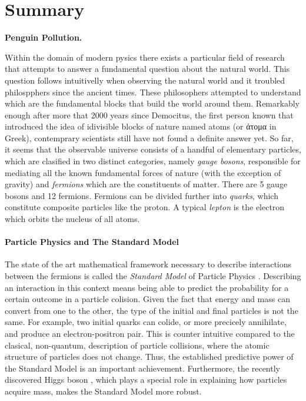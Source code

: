 \chapter*{Summary}
\chaptermark{}

{\Large\bf
  Penguin Pollution.
}
\vspace*{0.05\textwidth}

Within the domain of modern pysics there exists a particular field of research
that attempts to answer a fundamental question about the natural world. This
question follows intuitivelly when observing the natural world and it troubled
philospphers since the ancient times. These philosophers attempted to understand
which are the fundamental blocks that build the world around them. Remarkably
enough after more that 2000 years since Democitus, the first person known that
introduced the idea of idivisible blocks of nature named atoms (or \textgreek{άτομα} in Greek),
contemprary scientists still have not found a definite answer yet. So far, it seems that the observable
universe consists of a handful of elementary particles, which are clasified in two
distinct categories, namely {\it gauge bosons}, responsible for mediating all the
known fundamental forces of nature (with the exception of gravity) and {\it fermions}
which are the constituents of matter. There are 5 gauge bosons and 12 fermions.
Fermions can be divided further into {\it quarks}, which constitute composite
particles like the proton. A typical {\it lepton} is the electron which orbits
the nucleus of all atoms.

\subsubsection{Particle Physics and The Standard Model}
The state of the art mathematical framework necessary to describe interactions between the
fermions is called the \textit{Standard Model} of Particle Physics \cite{sm-glashow,sm-weinberg,sm-salam}.
Describing an interaction in this context means being able to predict the probability for a certain
outcome in a particle colision. Given the fact that energy and mass can convert
from one to the other, the type of the initial and final particles is not the same. For example,
two initial quarks can colide, or more precicely annihilate, and produce an electron-positron pair.
This is counter intuitive compared to the clasical, non-quantum, description of particle collisions,
where the atomic structure of particles does not change. Thus, the established predictive power of
the Standard Model is an important achievement. Furthermore, the recently
discovered Higgs boson \cite{higgs-cms,higgs-atlas}, which plays a special role in explaining how
particles acquire mass, makes the Standard Model more robust.

